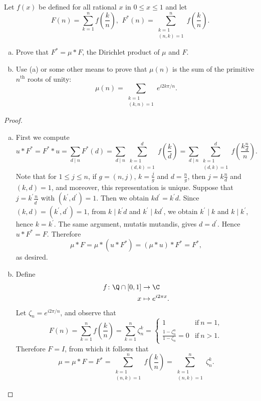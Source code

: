 \documentclass[10pt]{amsart}
\begin{document}
\begin{thm}
  Let $f(x)$ be defined for all rational $x$ in $0 \leq x \leq 1$ and let
  $$F(n) = \sum_{k=1}^n f\left(\frac{k}{n}\right),\,\ F^*(n) = \sum_{\substack{k = 1\\(n,k) = 1}}^n f\left(\frac{k}{n}\right).$$
  \begin{enumerate}[(a)]
  \item
    Prove that $F^* = \mu \ast F$, the Dirichlet product of $\mu$ and $F$.
  \item
    Use (a) or some other means to prove that $\mu(n)$ is the sum of the primitive $n^\text{th}$ roots of unity:
    $$\mu(n) = \sum_{\substack{k = 1\\(k,n) = 1}} e^{i2k\pi/n}.$$
  \end{enumerate}
  
  \begin{proof}
    \begin{enumerate}[(a)]
    \item
      First we compute
      $$u \ast F^* = F^* \ast u = \sum_{d \mid n} F^*(d) = \sum_{d \mid n}\sum_{\substack{k = 1\\(d,k) = 1}}^d f\left(\frac{k}{d}\right) = \sum_{d \mid n}\sum_{\substack{k = 1\\(d,k) = 1}}^d f\left(\frac{k\frac{n}{d}}{n}\right).$$
      Note that for $1 \leq j \leq n$, if $g = (n,j)$, $k = \frac{j}{g}$ and $d = \frac{n}{g}$, then $j = k\frac{n}{d}$ and $(k,d) = 1$, and moreover, this representation is unique.
      Suppose that $j = k^\prime\frac{n}{d^\prime}$ with $(k^\prime, d^\prime) = 1$.
      Then we obtain $kd^\prime = k^\prime d$.
      Since $(k,d) = (k^\prime, d^\prime) = 1$, from $k \mid k^\prime d$ and $k^\prime \mid k d^\prime$, we obtain $k^\prime \mid k$ and $k \mid k^\prime$, hence $k = k^\prime$.
      The same argument, mutatis mutandis, gives $d = d^\prime$.
      Hence $u \ast F^* = F$.
      Therefore
      $$\mu \ast F = \mu \ast (u \ast F^*) = (\mu \ast u) \ast F^* = F^*,$$
      as desired.
    \item
      Define
      \begin{align*}
        f \colon \Q \cap [0,1] & \rightarrow \C\\
        x & \mapsto e^{i2\pi x}.
      \end{align*}
      Let $\zeta_n = e^{i2\pi/n}$, and observe that
      $$F(n) = \sum_{k=1}^n f\left(\frac{k}{n}\right) = \sum_{k = 1}^n \zeta_n^k = \left\{ \begin{array}{ll}
        1 & \text{if}\ n = 1,\\
        \frac{1 - \zeta_n^n}{1 - \zeta_n} = 0 & \text{if}\ n > 1.
      \end{array}\right.$$
      Therefore $F = I$, from which it follows that
      $$\mu = \mu \ast F = F^* = \sum_{\substack{k = 1\\(n,k) = 1}}^n f\left(\frac{k}{n}\right) = \sum_{\substack{k = 1\\(n,k) = 1}}^n \zeta_n^k.$$
    \end{enumerate}
  \end{proof}
\end{thm}
\end{document}
